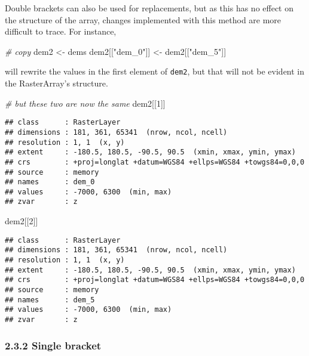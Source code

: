 \documentclass[]{article}
\newenvironment{Shaded}{\begin{snugshade}}{\end{snugshade}}
\newcommand{\DecValTok}[1]{\textcolor[rgb]{0.00,0.00,0.81}{#1}}
\newcommand{\StringTok}[1]{\textcolor[rgb]{0.31,0.60,0.02}{#1}}
\newcommand{\CommentTok}[1]{\textcolor[rgb]{0.56,0.35,0.01}{\textit{#1}}}
\newcommand{\NormalTok}[1]{#1}
\begin{document}
Double brackets can also be used for replacements, but as this has no
effect on the structure of the array, changes implemented with this
method are more difficult to trace. For instance,

\begin{Shaded}
\begin{Highlighting}[]
\CommentTok{# copy}
\NormalTok{dem2 <-}\StringTok{ }\NormalTok{dems}
\NormalTok{dem2[[}\StringTok{"dem_0"}\NormalTok{]] <-}\StringTok{ }\NormalTok{dem2[[}\StringTok{"dem_5"}\NormalTok{]]}
\end{Highlighting}
\end{Shaded}

will rewrite the values in the first element of \texttt{dem2}, but that
will not be evident in the RasterArray's structure.

\begin{Shaded}
\begin{Highlighting}[]
\CommentTok{# but these two are now the same}
\NormalTok{dem2[[}\DecValTok{1}\NormalTok{]]}
\end{Highlighting}
\end{Shaded}

\begin{verbatim}
## class      : RasterLayer 
## dimensions : 181, 361, 65341  (nrow, ncol, ncell)
## resolution : 1, 1  (x, y)
## extent     : -180.5, 180.5, -90.5, 90.5  (xmin, xmax, ymin, ymax)
## crs        : +proj=longlat +datum=WGS84 +ellps=WGS84 +towgs84=0,0,0 
## source     : memory
## names      : dem_0 
## values     : -7000, 6300  (min, max)
## zvar       : z
\end{verbatim}

\begin{Shaded}
\begin{Highlighting}[]
\NormalTok{dem2[[}\DecValTok{2}\NormalTok{]]}
\end{Highlighting}
\end{Shaded}

\begin{verbatim}
## class      : RasterLayer 
## dimensions : 181, 361, 65341  (nrow, ncol, ncell)
## resolution : 1, 1  (x, y)
## extent     : -180.5, 180.5, -90.5, 90.5  (xmin, xmax, ymin, ymax)
## crs        : +proj=longlat +datum=WGS84 +ellps=WGS84 +towgs84=0,0,0 
## source     : memory
## names      : dem_5 
## values     : -7000, 6300  (min, max)
## zvar       : z
\end{verbatim}

\subsubsection{2.3.2 Single bracket}\label{single-bracket}
\end{document}
